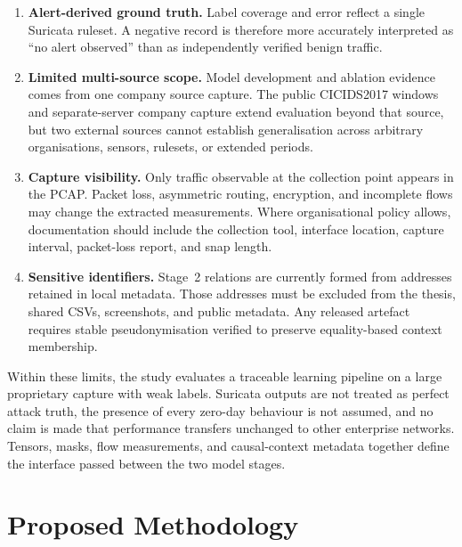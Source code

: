 \documentclass[11pt,fleqn]{report}
\begin{document}
\begin{enumerate}[label=\textbf{L\arabic*:},leftmargin=*]
    \item \textbf{Alert-derived ground truth.} Label coverage and error reflect a single Suricata ruleset. A negative record is therefore more accurately interpreted as ``no alert observed'' than as independently verified benign traffic.

    \item \textbf{Limited multi-source scope.} Model development and ablation evidence comes from one company source capture. The public CICIDS2017 windows and separate-server company capture extend evaluation beyond that source, but two external sources cannot establish generalisation across arbitrary organisations, sensors, rulesets, or extended periods.

    \item \textbf{Capture visibility.} Only traffic observable at the collection point appears in the PCAP. Packet loss, asymmetric routing, encryption, and incomplete flows may change the extracted measurements. Where organisational policy allows, documentation should include the collection tool, interface location, capture interval, packet-loss report, and snap length.

    \item \textbf{Sensitive identifiers.} Stage~2 relations are currently formed from addresses retained in local metadata. Those addresses must be excluded from the thesis, shared CSVs, screenshots, and public metadata. Any released artefact requires stable pseudonymisation verified to preserve equality-based context membership.
\end{enumerate}

Within these limits, the study evaluates a traceable learning pipeline on a large proprietary capture with weak labels. Suricata outputs are not treated as perfect attack truth, the presence of every zero-day behaviour is not assumed, and no claim is made that performance transfers unchanged to other enterprise networks. Tensors, masks, flow measurements, and causal-context metadata together define the interface passed between the two model stages.

\providecommand{\methodfield}[1]{\texttt{\detokenize{#1}}}

\chapter{Proposed Methodology}
\label{sec:proposed_methodology}
\end{document}
